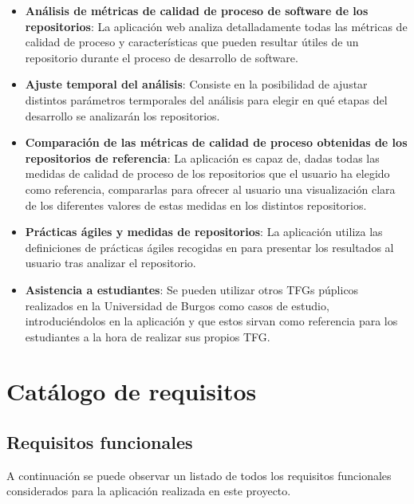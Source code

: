 \begin{itemize}

\item \textbf{Análisis de métricas de calidad de proceso de software de los repositorios}: La aplicación web analiza detalladamente todas las métricas de calidad de proceso y características que pueden resultar útiles de un repositorio durante el proceso de desarrollo de software.

\item \textbf{Ajuste temporal del análisis}: Consiste en la posibilidad de ajustar distintos parámetros termporales del análisis para elegir en qué etapas del desarrollo se analizarán los repositorios.

\item \textbf{Comparación de las métricas de calidad de proceso obtenidas de los repositorios de referencia}: La aplicación es capaz de, dadas todas las medidas de calidad de proceso de los repositorios que el usuario ha elegido como referencia, compararlas para ofrecer al usuario una visualización clara de los diferentes valores de estas medidas en los distintos repositorios.

\item \textbf{Prácticas ágiles y medidas de repositorios}: La aplicación utiliza las definiciones de prácticas ágiles recogidas en \cite{agileSubwayMap} para presentar los resultados al usuario tras analizar el repositorio.

\item \textbf{Asistencia a estudiantes}: Se pueden utilizar otros TFGs púplicos realizados en la Universidad de Burgos como casos de estudio, introduciéndolos en la aplicación y que estos sirvan como referencia para los estudiantes a la hora de realizar sus propios TFG.

\end{itemize}

\section{Catálogo de requisitos}

\subsection{Requisitos funcionales}
A continuación se puede observar un listado de todos los requisitos funcionales considerados para la aplicación realizada en este proyecto.

